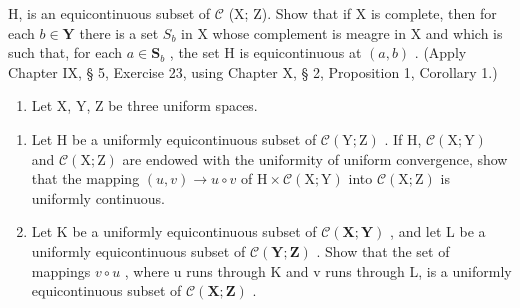 H, is an equicontinuous subset of \(\mathcal{C}\) (X; Z). Show that if X is complete, then for each \(b \in \mathbf{Y}\) there is a set \(S_b\) in X whose complement is meagre in X and which is such that, for each \(a \in \mathbf{S}_b\) , the set H is equicontinuous at \((a, b)\) . (Apply Chapter IX, § 5, Exercise 23, using Chapter X, § 2, Proposition 1, Corollary 1.)

\begin{enumerate}
\def\labelenumi{\arabic{enumi})}
\setcounter{enumi}{3}
\tightlist
\item
  Let X, Y, Z be three uniform spaces.
\end{enumerate}

\begin{enumerate}
\def\labelenumi{\alph{enumi})}
\item
  Let H be a uniformly equicontinuous subset of \(\mathcal{C}(\mathrm{Y};\mathrm{Z})\) . If H, \(\mathcal{C}(\mathrm{X};\mathrm{Y})\) and \(\mathcal{C}(\mathrm{X};\mathrm{Z})\) are endowed with the uniformity of uniform convergence, show that the mapping \((u,v)\to u\circ v\) of \(\mathrm{H}\times \mathcal{C}(\mathrm{X};\mathrm{Y})\) into \(\mathcal{C}(\mathrm{X};\mathrm{Z})\) is uniformly continuous.
\item
  Let K be a uniformly equicontinuous subset of \(\mathcal{C}(\mathbf{X};\mathbf{Y})\) , and let L be a uniformly equicontinuous subset of \(\mathcal{C}(\mathbf{Y};\mathbf{Z})\) . Show that the set of mappings \(v \circ u\) , where u runs through K and v runs through L, is a uniformly equicontinuous subset of \(\mathcal{C}(\mathbf{X};\mathbf{Z})\) .
\end{enumerate}

